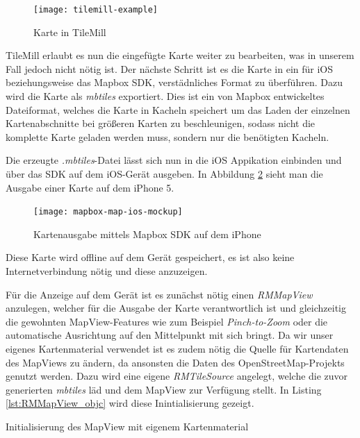 \begin{figure}[htb!]
	\centering
	\texttt{[image: tilemill-example]}
	\caption{Karte in TileMill}
	\label{tilemill-example}
\end{figure}

TileMill erlaubt es nun die eingefügte Karte weiter zu bearbeiten, was in unserem Fall jedoch nicht nötig ist.
Der nächste Schritt ist es die Karte in ein für iOS beziehungsweise das Mapbox SDK, verstädnliches Format zu überführen.
Dazu wird die Karte als \emph{mbtiles} exportiert. Dies ist ein von Mapbox entwickeltes Dateiformat, welches die Karte in Kacheln speichert um das Laden der einzelnen Kartenabschnitte bei größeren Karten zu beschleunigen, sodass nicht die komplette Karte geladen werden muss, sondern nur die benötigten Kacheln.

Die erzeugte \emph{.mbtiles}-Datei lässt sich nun in die iOS Appikation einbinden und über das SDK auf dem iOS-Gerät ausgeben. In Abbildung \ref{mapbox-map-ios} sieht man die Ausgabe einer Karte auf dem iPhone 5.

\begin{figure}[htb!]
		\centering
	\texttt{[image: mapbox-map-ios-mockup]}
	\caption{Kartenausgabe mittels Mapbox SDK auf dem iPhone}
	\label{mapbox-map-ios}
\end{figure}

Diese Karte wird offline auf dem Gerät gespeichert, es ist also keine Internetverbindung nötig und diese anzuzeigen.

Für die Anzeige auf dem Gerät ist es zunächst nötig einen \emph{RMMapView} anzulegen, welcher für die Ausgabe der Karte verantwortlich ist und gleichzeitig die gewohnten MapView-Features wie zum Beispiel \emph{Pinch-to-Zoom} oder die automatische Ausrichtung auf den Mittelpunkt mit sich bringt.
Da wir unser eigenes Kartenmaterial verwendet ist es zudem nötig die Quelle für Kartendaten des MapViews zu ändern, da ansonsten die Daten des OpenStreetMap-Projekts genutzt werden. Dazu wird eine eigene \emph{RMTileSource} angelegt, welche die zuvor generierten \emph{mbtiles} läd und dem MapView zur Verfügung stellt. 
In Listing \ref{lst:RMMapView_objc} wird diese Inintialisierung gezeigt.
\begin{listing}[htb!]
    \caption{Initialisierung des MapView mit eigenem Kartenmaterial}
	\label{lst:RMMapView_objc}
\end{listing}

